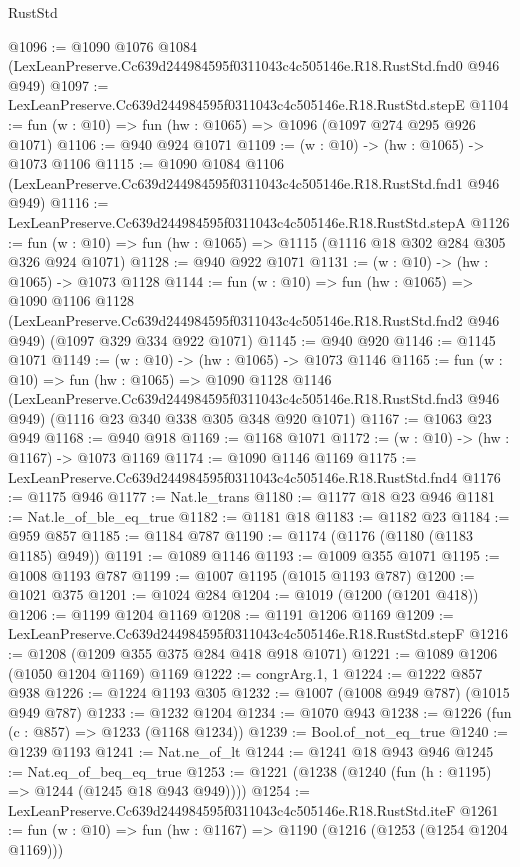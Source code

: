 \begin{lexlean}{RustStd}
\begin{coremodule}
@1096 := @1090
    @1076
    @1084
    (LexLeanPreserve.Cc639d244984595f0311043c4c505146e.R18.RustStd.fnd0 @946 @949)
@1097 := LexLeanPreserve.Cc639d244984595f0311043c4c505146e.R18.RustStd.stepE
@1104 := fun (w : @10) => fun (hw : @1065) => @1096 (@1097 @274 @295 @926 @1071)
@1106 := @940 @924 @1071
@1109 := (w : @10) -> (hw : @1065) -> @1073 @1106
@1115 := @1090
    @1084
    @1106
    (LexLeanPreserve.Cc639d244984595f0311043c4c505146e.R18.RustStd.fnd1 @946 @949)
@1116 := LexLeanPreserve.Cc639d244984595f0311043c4c505146e.R18.RustStd.stepA
@1126 := fun (w : @10) => fun (hw : @1065) => @1115 (@1116 @18 @302 @284 @305 @326 @924 @1071)
@1128 := @940 @922 @1071
@1131 := (w : @10) -> (hw : @1065) -> @1073 @1128
@1144 := fun (w : @10) =>
  fun (hw : @1065) =>
  @1090
    @1106
    @1128
    (LexLeanPreserve.Cc639d244984595f0311043c4c505146e.R18.RustStd.fnd2 @946 @949)
    (@1097 @329 @334 @922 @1071)
@1145 := @940 @920
@1146 := @1145 @1071
@1149 := (w : @10) -> (hw : @1065) -> @1073 @1146
@1165 := fun (w : @10) =>
  fun (hw : @1065) =>
  @1090
    @1128
    @1146
    (LexLeanPreserve.Cc639d244984595f0311043c4c505146e.R18.RustStd.fnd3 @946 @949)
    (@1116 @23 @340 @338 @305 @348 @920 @1071)
@1167 := @1063 @23 @949
@1168 := @940 @918
@1169 := @1168 @1071
@1172 := (w : @10) -> (hw : @1167) -> @1073 @1169
@1174 := @1090 @1146 @1169
@1175 := LexLeanPreserve.Cc639d244984595f0311043c4c505146e.R18.RustStd.fnd4
@1176 := @1175 @946
@1177 := Nat.le_trans
@1180 := @1177 @18 @23 @946
@1181 := Nat.le_of_ble_eq_true
@1182 := @1181 @18
@1183 := @1182 @23
@1184 := @959 @857
@1185 := @1184 @787
@1190 := @1174 (@1176 (@1180 (@1183 @1185) @949))
@1191 := @1089 @1146
@1193 := @1009 @355 @1071
@1195 := @1008 @1193 @787
@1199 := @1007 @1195 (@1015 @1193 @787)
@1200 := @1021 @375
@1201 := @1024 @284
@1204 := @1019 (@1200 (@1201 @418))
@1206 := @1199 @1204 @1169
@1208 := @1191 @1206 @1169
@1209 := LexLeanPreserve.Cc639d244984595f0311043c4c505146e.R18.RustStd.stepF
@1216 := @1208 (@1209 @355 @375 @284 @418 @918 @1071)
@1221 := @1089 @1206 (@1050 @1204 @1169) @1169
@1222 := congrArg.{1, 1}
@1224 := @1222 @857 @938
@1226 := @1224 @1193 @305
@1232 := @1007 (@1008 @949 @787) (@1015 @949 @787)
@1233 := @1232 @1204
@1234 := @1070 @943
@1238 := @1226 (fun (c : @857) => @1233 (@1168 @1234))
@1239 := Bool.of_not_eq_true
@1240 := @1239 @1193
@1241 := Nat.ne_of_lt
@1244 := @1241 @18 @943 @946
@1245 := Nat.eq_of_beq_eq_true
@1253 := @1221 (@1238 (@1240 (fun (h : @1195) => @1244 (@1245 @18 @943 @949))))
@1254 := LexLeanPreserve.Cc639d244984595f0311043c4c505146e.R18.RustStd.iteF
@1261 := fun (w : @10) => fun (hw : @1167) => @1190 (@1216 (@1253 (@1254 @1204 @1169)))

\end{coremodule}
\end{lexlean}
